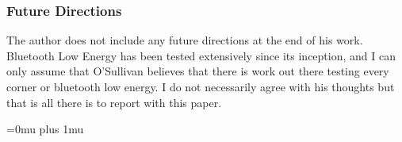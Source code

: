 \subsubsection{Future Directions}

\noindent
The author does not include any future directions at the end of his work. Bluetooth Low Energy has been tested extensively since its inception, and I can only assume that O'Sullivan believes that there is work out there testing every corner or bluetooth low energy. I do not necessarily agree with his thoughts but that is all there is to report with this paper.

\Urlmuskip=0mu plus 1mu\relax

\pagebreak